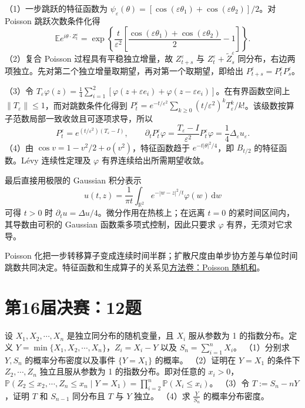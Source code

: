 \begin{solve}

（1）一步跳跃的特征函数为 $\psi_\varepsilon(\theta)=[\cos(\varepsilon\theta_1)+\cos(\varepsilon\theta_2)]/2$。对 Poisson 跳跃次数条件化得
\[
\mathbb E e^{i\theta\cdot Z_t^\varepsilon}
=\exp\left\{\frac t{\varepsilon^2}
\left[\frac{\cos(\varepsilon\theta_1)+\cos(\varepsilon\theta_2)}2-1\right]\right\}.
\]
（2）复合 Poisson 过程具有平稳独立增量，故 $Z_{t+s}^\varepsilon$ 与 $Z_t^\varepsilon+\widetilde Z_s^\varepsilon$ 同分布，右边两项独立。先对第二个独立增量取期望，再对第一个取期望，即给出 $P_{t+s}^\varepsilon=P_t^\varepsilon P_s^\varepsilon$。

（3）令 $T_\varepsilon\varphi(z)=\frac14\sum_{i=1}^2[\varphi(z+\varepsilon e_i)+\varphi(z-\varepsilon e_i)]$。在有界函数空间上 $\|T_\varepsilon\|\le1$，而对跳数条件化得到 $P_t^\varepsilon=e^{-t/\varepsilon^2}\sum_{k\ge0}(t/\varepsilon^2)^kT_\varepsilon^k/k!$。该级数按算子范数局部一致收敛且可逐项求导，所以
\[
P_t^\varepsilon=e^{(t/\varepsilon^2)(T_\varepsilon-I)},\qquad
\partial_tP_t^\varepsilon\varphi=\frac{T_\varepsilon-I}{\varepsilon^2}P_t^\varepsilon\varphi
=\frac14\Delta_\varepsilon u_\varepsilon.
\]
（4）由 $\cos v=1-v^2/2+o(v^2)$，特征函数趋于 $e^{-t|\theta|^2/4}$，即 $B_{t/2}$ 的特征函数。Lévy 连续性定理及 $\varphi$ 有界连续给出所需期望收敛。

最后直接用极限的 Gaussian 积分表示
\[
u(t,z)=\frac1{\pi t}\int_{\mathbb R^2}e^{-|w-z|^2/t}\varphi(w)\,\mathrm dw
\]
可得 $t>0$ 时 $\partial_tu=\Delta u/4$。微分作用在热核上；在远离 $t=0$ 的紧时间区间内，其导数由可积的 Gaussian 函数乘多项式控制，因此只要求 $\varphi$ 有界，无须对它求导。

\end{solve}

\begin{remark}[方法与条件]

Poisson 化把一步转移算子变成连续时间半群；扩散尺度由单步协方差与单位时间跳数共同决定。特征函数和生成算子的关系见\hyperref[app:probability-poisson]{方法卷：Poisson 随机和}。

\end{remark}

\section{第16届决赛：12题}\label{pr:fin16-high:12}

\begin{example}[公开题解转录]\label{q:fin16-high:12}

设 $X_1,X_2,\cdots,X_n$ 是独立同分布的随机变量，且 $X_i$ 服从参数为 1 的指数分布。定义 $Y = \min\{X_1,X_2,\cdots,X_n\}$，$Z_i = X_i - Y$ 以及 $S_n = \sum_{i=1}^{n}X_i$。
（1）分别求 $Y,S_n$ 的概率分布密度以及事件 $\{Y = X_1\}$ 的概率。
（2）证明在 $Y = X_1$ 的条件下 $Z_2,\cdots,Z_n$ 独立且服从参数为 1 的指数分布。即对任意的 $x_i > 0$，$\mathbb{P}(Z_2 \leq x_2,\cdots,Z_n \leq x_n \mid Y = X_1) = \prod_{i=2}^{n}\mathbb{P}(X_i \leq x_i)$。
（3）令 $T := S_n - nY$，证明 $T$ 和 $S_{n-1}$ 同分布且 $T$ 与 $Y$ 独立。
（4）求 $\frac{Y}{S_n}$ 的概率分布密度。

\end{example}

